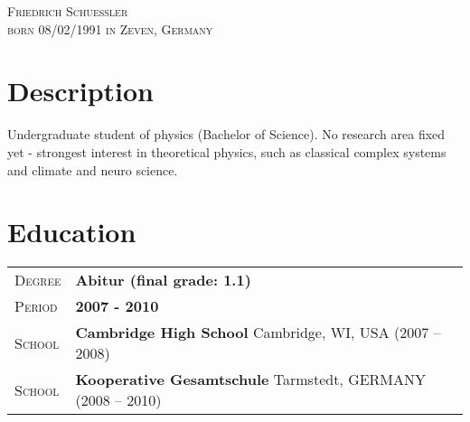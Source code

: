 \documentclass[a4paper, oneside, final]{scrartcl} %
\newcommand{\gray}{\rowcolor[gray]{.90}} %
\begin{document}
\begin{center} %


{\fontsize{24}{24}\selectfont\scshape Friedrich Schuessler\\
\vspace{0.2cm} %
\fontsize{14}{2}\selectfont\scshape born 08/02/1991 in Zeven, Germany
    } %




\section{Description}
Undergraduate student of physics (Bachelor of Science). No research area fixed yet - strongest 
interest in theoretical physics, such as classical complex systems and climate and neuro science.

\section{Education}

\begin{tabularx}{0.97\linewidth}{>{\raggedleft\scshape}p{2cm}X}
\gray Degree & \textbf{Abitur (final grade: 1.1)}\\
\gray Period & \textbf{2007 - 2010}\\
\gray School & \textbf{Cambridge High School} \hfill Cambridge, WI, USA (2007 -- 2008)\\
\gray School & \textbf{Kooperative Gesamtschule} \hfill Tarmstedt, GERMANY (2008 -- 2010)\\
\end{tabularx}


\end{center}
\end{document}
